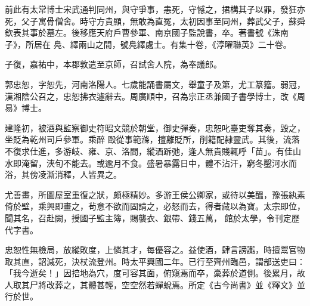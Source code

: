 \begin{pinyinscope}
 前此有太常博士宋武通判同州，與守爭事，恚死，守憾之，捃構其子以罪，發狂亦死，父子寓骨僧舍。時守方貴顯，無敢為直冤，太初因事至同州，葬武父子，蘇舜欽表其事於墓左。後移應天府戶曹參軍、南京國子監說書，卒。著書號《洙南子》，所居在
 鳧、繹兩山之間，號鳧繹處士。有集十卷，《淳曜聯英》二十卷。



 子復，嘉祐中，本郡敦遣至京師，召試舍人院，為奉議郎。



 郭忠恕，字恕先，河南洛陽人。七歲能誦書屬文，舉童子及第，尤工篆籀。弱冠，漢湘陰公召之，忠恕拂衣遽辭去。周廣順中，召為宗正丞兼國子書學博士，改《周易》博士。



 建隆初，被酒與監察御史符昭文競於朝堂，御史彈奏，忠恕叱臺吏奪其奏，毀之，坐貶為乾州司戶參軍。乘醉
 毆從事範滌，擅離貶所，削籍配隸靈武。其後，流落不復求仕進，多游岐、雍、京、洛間，縱酒跅弛，逢人無貴賤輒呼「苗」。有佳山水即淹留，浹旬不能去。或逾月不食。盛暑暴露日中，體不沾汗，窮冬鑿河水而浴，其傍凌澌消釋，人皆異之。



 尤善畫，所圖屋室重復之狀，頗極精妙。多游王侯公卿家，或待以美醞，豫張紈素倚於壁，乘興即畫之，茍意不欲而固請之，必怒而去，得者藏以為寶。太宗即位，聞其名，召赴闕，授國子監主簿，賜襲衣、銀帶、錢五萬，
 館於太學，令刊定歷代字書。



 忠恕性無檢局，放縱敗度，上憐其才，每優容之。益使酒，肆言謗讟，時擅鬻官物取其直，詔減死，決杖流登州。時太平興國二年。已行至齊州臨邑，謂部送吏曰：「我今逝矣！」因掊地為穴，度可容其面，俯窺焉而卒，稾葬於道側。後累月，故人取其尸將改葬之，其體甚輕，空空然若蟬蛻焉。所定《古今尚書》並《釋文》並行於世。



\end{pinyinscope}